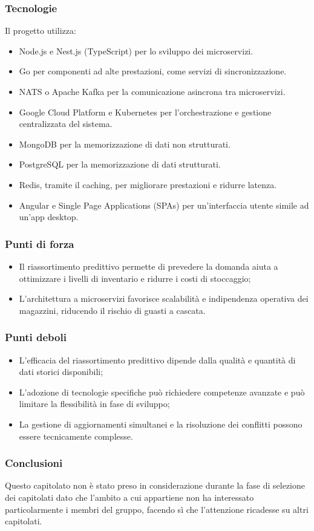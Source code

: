     \subsubsection{Tecnologie}
    Il progetto utilizza:

\begin{itemize}
    \item Node.js e Nest.js (TypeScript) per lo sviluppo dei microservizi.
    \item Go per componenti ad alte prestazioni, come servizi di sincronizzazione.
    \item NATS o Apache Kafka per la comunicazione asincrona tra microservizi.
    \item Google Cloud Platform e Kubernetes per l’orchestrazione e gestione centralizzata del sistema.
    \item MongoDB per la memorizzazione di dati non strutturati.
    \item PostgreSQL per la memorizzazione di dati strutturati.
    \item Redis, tramite il caching, per migliorare prestazioni e ridurre latenza.
    \item Angular e Single Page Applications (SPAs) per un’interfaccia utente simile ad un’app desktop.
\end{itemize}
    \subsubsection{Punti di forza}
   \begin{itemize}
    \item Il riassortimento predittivo permette di prevedere la domanda aiuta a ottimizzare i livelli di inventario e ridurre i costi di stoccaggio;
    \item L’architettura a microservizi favorisce scalabilità e indipendenza operativa dei magazzini, riducendo il rischio di guasti a cascata.
\end{itemize}
    \subsubsection{Punti deboli}
    \begin{itemize}
    \item L’efficacia del riassortimento predittivo dipende dalla qualità e quantità di dati storici disponibili;
    \item L’adozione di tecnologie specifiche può richiedere competenze avanzate e può limitare la flessibilità in fase di sviluppo;
    \item La gestione di aggiornamenti simultanei e la risoluzione dei conflitti possono essere tecnicamente complesse.
\end{itemize}
    \subsubsection{Conclusioni}
    Questo capitolato non è stato preso in considerazione durante la fase di selezione dei capitolati dato che l’ambito a cui appartiene non ha interessato particolarmente i membri del gruppo, facendo sì che l’attenzione ricadesse su altri capitolati.
